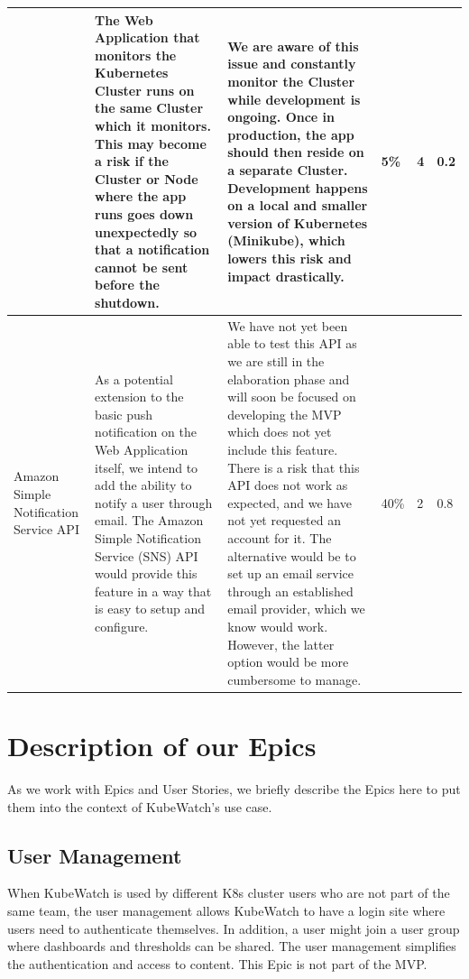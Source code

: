 \begin{longtable}[h!]{p{2.2cm} | p{4cm} | p{4cm} | p{1.5cm} | p{1.5cm} | p{1.5cm}}
            & The Web Application that monitors the Kubernetes Cluster runs on the same Cluster which it monitors. This may become a risk if the Cluster or Node where the app runs goes down unexpectedly so that a notification cannot be sent before the shutdown.
            & We are aware of this issue and constantly monitor the Cluster while development is ongoing. Once in production, the app should then reside on a separate Cluster. Development happens on a local and smaller version of Kubernetes (Minikube), which lowers this risk and impact drastically.
            & 5\% & 4 & 0.2 \\ \hline
        Amazon Simple Notification Service API
            & As a potential extension to the basic push notification on the Web Application itself, we intend to add the ability to notify a user through email. The Amazon Simple Notification Service (SNS) API would provide this feature in a way that is easy to setup and configure.
            & We have not yet been able to test this API as we are still in the elaboration phase and will soon be focused on developing the MVP which does not yet include this feature. There is a risk that this API does not work as expected, and we have not yet requested an account for it. The alternative would be to set up an email service through an established email provider, which we know would work. However, the latter option would be more cumbersome to manage.
            & 40\% & 2 & 0.8 \\ \hline
\end{longtable}


\section{Description of our Epics}

As we work with Epics and User Stories, we briefly describe the Epics here to put them into the context of KubeWatch's use case.

\subsection{User Management}
When KubeWatch is used by different K8s cluster users who are not part of the same team, the user management allows KubeWatch to have a login site where users need to authenticate themselves. In addition, a user might join a user group where dashboards and thresholds can be shared. The user management simplifies the authentication and access to content. This Epic is not part of the MVP.

